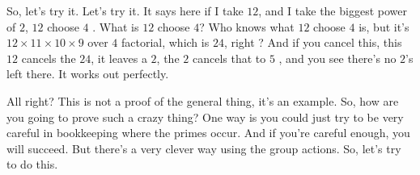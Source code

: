 \begin{speech}[00:27:26 - 00:28:14]
So, let's try it. Let's try it. It says here if I take $12$, and I take the biggest power of $2$, $12$ choose $4$ . What is $12$ choose $4$? Who knows what $12$ choose $4$ is, but it's $12 \times 11 \times 10 \times 9$ over $4$ factorial, which is $24$, right ? And if you cancel this, this $12$ cancels the $24$, it leaves a $2$, the $2$ cancels that to $5$ , and you see there's no $2$'s left there. It works out perfectly.

All right? This is not a proof of the general thing, it's an example. So, how are you going to prove such a crazy thing? One way is you could just try to be very careful in bookkeeping where the primes occur. And if you're careful enough, you will succeed. But there's a very clever way using the group actions. So, let's try to do this.
\end{speech}

\begin{content}[Numerical Check for \texorpdfstring{$n = 12, p = 2$}{n = 12, p = 2}]
\end{content}

